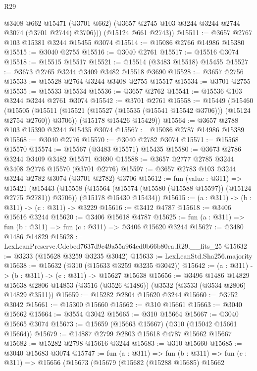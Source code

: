 \begin{lexlean}{R29}
\begin{coremodule}
          @3408
          @662
          @15471
          (@3701 @662)
          (@3657 @2745 @103 @3244 @3244 @2744 @3074 (@3701 @2744) @3706)))
      (@15124 @661 @2743))
@15511 := @3657 @2767 @103 @15381 @3244 @15455 @3074
@15514 := @15086 @2766 @14986 @15380
@15515 := @3040 @2755
@15516 := @3040 @2761
@15517 := @15516 @3074
@15518 := @15515 @15517
@15521 := @15514 (@3483 @15518) @15455
@15527 := @3673 @2765 @3244 @3409 @3482 @15518 @3690
@15528 := @3657 @2756
@15533 := @15528 @2764 @3244 @3408 @2755 @15517
@15534 := @3701 @2755
@15535 := @15533 @15534
@15536 := @3657 @2762
@15541 := @15536 @103 @3244 @3244 @2761 @3074
@15542 := @3701 @2761
@15558 := @15449
    (@15460
      (@15505 (@15511 (@15521 (@15527 (@15535 (@15541 @15542 @3706))) (@15124 @2754 @2760)) @3706))
      (@15178 @15426 @15429))
@15564 := @3657 @2788 @103 @15390 @3244 @15435 @3074
@15567 := @15086 @2787 @14986 @15389
@15568 := @3040 @2776
@15570 := @3040 @2782 @3074
@15571 := @15568 @15570
@15574 := @15567 (@3483 @15571) @15435
@15580 := @3673 @2786 @3244 @3409 @3482 @15571 @3690
@15588 := @3657 @2777 @2785 @3244 @3408 @2776 @15570 (@3701 @2776)
@15597 := @3657 @2783 @103 @3244 @3244 @2782 @3074 (@3701 @2782) @3706
@15612 := fun (value : @311) =>
  @15421
    (@15443
      (@15558 (@15564 (@15574 (@15580 (@15588 @15597)) (@15124 @2775 @2781)) @3706))
      (@15178 @15430 @15434))
@15615 := (a : @311) -> (b : @311) -> (c : @311) -> @3229
@15616 := @3412 @4787
@15618 := @3406 @15616 @3244
@15620 := @3406 @15618 @4787
@15625 := fun (a : @311) => fun (b : @311) => fun (c : @311) => @3406 @15620 @3244
@15627 := @3480 @1486 @14829
@15628 := LexLeanPreserve.Cdebed7637d9c49a55a964ed0b66b80ca.R29.__fits_25
@15632 := @3233 (@15628 @3259 @3235 @3042)
@15633 := LexLeanStd.Sha256.majority
@15638 := @15632 (@310 (@15633 @3259 @3235 @3042))
@15642 := (a : @311) -> (b : @311) -> (c : @311) -> @15627 @15638
@15656 := @3496
    @1486
    @14829
    @15638
    @2806
    @14853
    (@3516 (@3526 @1486))
    (@3532 (@3533 (@3534 @2806) @14829 @3511))
@15659 := @15282 @2804 @15620 @3244
@15660 := @3752 @3042
@15661 := @15300 @15660
@15662 := @310 @15661
@15663 := @3040 @15662
@15664 := @3554 @3042
@15665 := @310 @15664
@15667 := @3040 @15665 @3074
@15673 := @15659 (@15663 @15667) (@310 (@15042 @15661 @15664))
@15679 := @14887 @2799 @2803 @15618 @4787 @15662 @15667
@15682 := @15282 @2798 @15616 @3244
@15683 := @310 @15660
@15685 := @3040 @15683 @3074
@15747 := fun (a : @311) =>
  fun (b : @311) =>
  fun (c : @311) =>
  @15656
    (@15673
      (@15679
        (@15682
          (@15288 @15685)
          @15662

\end{coremodule}
\end{lexlean}
